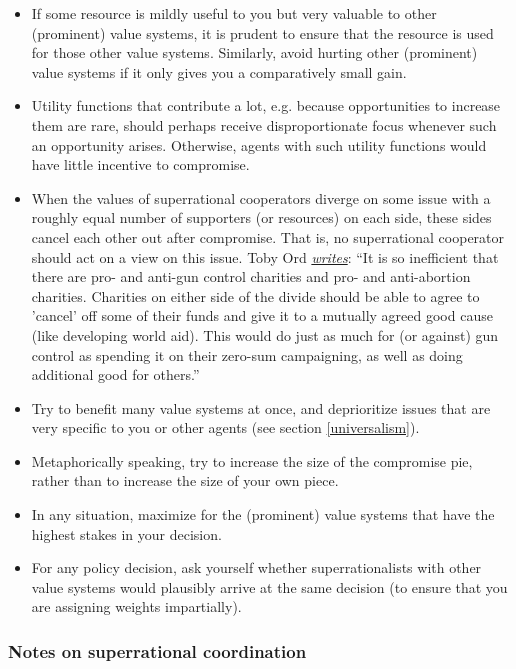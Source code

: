 \begin{itemize}
\item
  If some resource is mildly useful to you but very valuable to other
  (prominent) value systems, it is prudent to ensure that the resource
  is used for those other value systems. Similarly, avoid hurting other
  (prominent) value systems if it only gives you a comparatively small
  gain.
\item
  Utility functions that contribute a lot, e.g. because opportunities to
  increase them are rare, should perhaps receive disproportionate focus
  whenever such an opportunity arises. Otherwise, agents with such
  utility functions would have little incentive to compromise.
\item
  When the values of superrational cooperators diverge on some issue
  with a roughly equal number of supporters (or resources) on each side,
  these sides cancel each other out after compromise. That is, no
  superrational cooperator should act on a view on this issue. Toby Ord
  \href{http://felicifia.org/viewtopic.php?t=79\#p486}{\emph{writes}}:
  ``It is so inefficient that there are pro- and anti-gun control
  charities and pro- and anti-abortion charities. Charities on either
  side of the divide should be able to agree to 'cancel' off some of
  their funds and give it to a mutually agreed good cause (like
  developing world aid). This would do just as much for (or against) gun
  control as spending it on their zero-sum campaigning, as well as doing
  additional good for others.''
\item
  Try to benefit many value systems at once, and deprioritize issues
  that are very specific to you or other agents (see section
  \ref{universalism}).
\item
  Metaphorically speaking, try to increase the size of the compromise
  pie, rather than to increase the size of your own piece.
\item
  In any situation, maximize for the (prominent) value systems that have
  the highest stakes in your decision.
\item
  For any policy decision, ask yourself whether superrationalists with
  other value systems would plausibly arrive at the same decision (to
  ensure that you are assigning weights impartially).
\end{itemize}

\hypertarget{notes-on-superrational-coordination}{\subsubsection{Notes
on superrational
coordination}\label{notes-on-superrational-coordination}}

